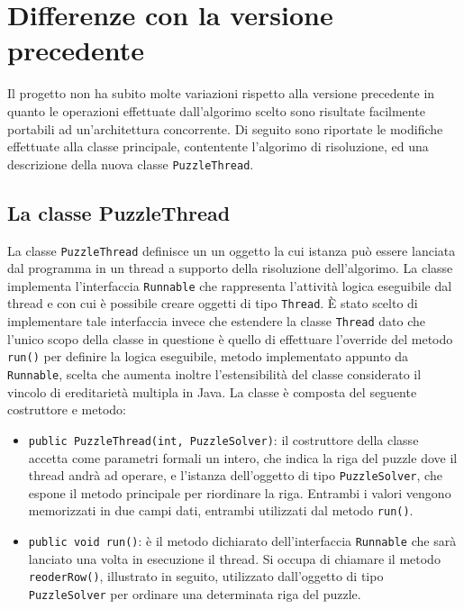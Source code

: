%
%

\section{Differenze con la versione precedente}
Il progetto non ha subito molte variazioni rispetto alla versione precedente in quanto le operazioni effettuate dall'algorimo scelto sono
risultate facilmente portabili ad un'architettura concorrente. Di seguito sono riportate le modifiche effettuate alla classe principale,
contentente l'algorimo di risoluzione, ed una descrizione della nuova classe \texttt{PuzzleThread}.


\subsection{La classe PuzzleThread}
La classe \texttt{PuzzleThread} definisce un un oggetto la cui istanza può essere lanciata dal programma in un thread a supporto della risoluzione dell'algorimo.
La classe implementa l'interfaccia \texttt{Runnable} che rappresenta l'attività logica eseguibile dal thread e con cui è possibile creare oggetti di tipo \texttt{Thread}.
È stato scelto di implementare tale interfaccia invece che estendere la classe \texttt{Thread} dato che l'unico scopo della classe in questione è quello di effettuare
l'override del metodo \texttt{run()} per definire la logica eseguibile, metodo implementato appunto da \texttt{Runnable}, scelta che aumenta inoltre l'estensibilità
del classe considerato il vincolo di ereditarietà multipla in Java.
La classe è composta del seguente costruttore e metodo:
\begin{itemize}
    \item \texttt{public PuzzleThread(int, PuzzleSolver)}: il costruttore della classe accetta come parametri formali un intero, che indica la riga del puzzle dove il
    thread andrà ad operare, e l'istanza dell'oggetto di tipo \texttt{PuzzleSolver}, che espone il metodo principale per riordinare la riga. Entrambi i valori vengono
    memorizzati in due campi dati, entrambi utilizzati dal metodo \texttt{run()}.
    \item \texttt{public void run()}: è il metodo dichiarato dell'interfaccia \texttt{Runnable} che sarà lanciato una volta in esecuzione il thread. Si occupa di chiamare
    il metodo \texttt{reoderRow()}, illustrato in seguito, utilizzato dall'oggetto di tipo \texttt{PuzzleSolver} per ordinare una determinata riga del puzzle.
\end{itemize}



